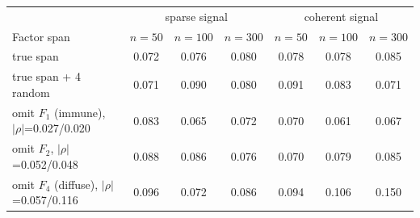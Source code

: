 \begin{tabular}{lcccccc}
\toprule
 & \multicolumn{3}{c}{sparse signal} & \multicolumn{3}{c}{coherent signal} \\
Factor span & $n{=}50$ & $n{=}100$ & $n{=}300$ & $n{=}50$ & $n{=}100$ & $n{=}300$ \\
\midrule
true span & 0.072 & 0.076 & 0.080 & 0.078 & 0.078 & 0.085 \\
true span + 4 random & 0.071 & 0.090 & 0.080 & 0.091 & 0.083 & 0.071 \\
omit $F_1$ (immune), $|\rho|$=0.027/0.020 & 0.083 & 0.065 & 0.072 & 0.070 & 0.061 & 0.067 \\
omit $F_2$, $|\rho|$=0.052/0.048 & 0.088 & 0.086 & 0.076 & 0.070 & 0.079 & 0.085 \\
omit $F_4$ (diffuse), $|\rho|$=0.057/0.116 & 0.096 & 0.072 & 0.086 & 0.094 & 0.106 & 0.150 \\
\bottomrule
\end{tabular}
